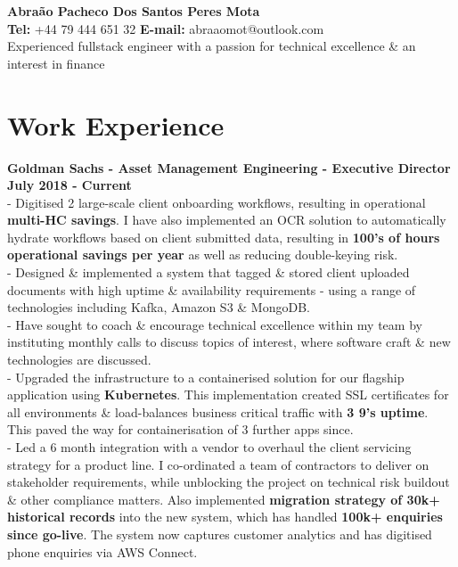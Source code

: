 \documentclass[a4paper,10pt]{article}
\begin{document}
	
	\begin{center}
		{\Large\bfseries Abra\~ao Pacheco Dos Santos Peres Mota} \\
		\vspace{2mm}
		{\textbf{Tel:} +44 79 444 651 32  } {\textbf{E-mail:} abraaomot@outlook.com } \\ \vspace{1mm}
	Experienced fullstack engineer with a passion for technical excellence \& an interest in finance
	\end{center}


	
	\section*{Work Experience}
	
		\textbf{Goldman Sachs - Asset Management Engineering - Executive Director}
		\\\textbf{July 2018 - Current} 
		\\ - Digitised 2 large-scale client onboarding workflows, resulting in operational \textbf{multi-HC savings}. I have also implemented an OCR solution to automatically hydrate workflows based on client submitted data, resulting in \textbf{100's of hours operational savings per year} as well as reducing double-keying risk.
		\\ - Designed \& implemented a system that tagged \& stored client uploaded documents with high uptime \& availability requirements - using a range of technologies including Kafka, Amazon S3 \& MongoDB.
		\\ - Have sought to coach \& encourage technical excellence within my team by instituting monthly calls to discuss topics of interest, where software craft \& new technologies are discussed. 
		\\ - Upgraded the infrastructure to a containerised solution for our flagship application using \textbf{Kubernetes}. This implementation created SSL certificates for all environments \& load-balances business critical traffic with \textbf{3 9's uptime}. This paved the way for containerisation of 3 further apps since.
		\\ - Led a 6 month integration with a vendor to overhaul the client servicing strategy for a product line. I co-ordinated a team of contractors to deliver on stakeholder requirements, while unblocking the project on technical risk buildout \& other compliance matters. Also implemented \textbf{migration strategy of 30k+ historical records} into the new system, which has handled \textbf{100k+ enquiries since go-live}. The system now captures customer analytics and has digitised phone enquiries via AWS Connect.
\end{document}
